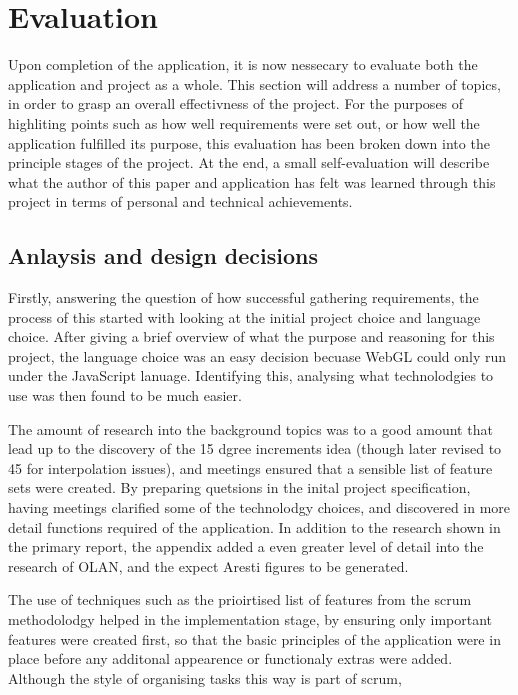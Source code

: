 \chapter{Evaluation}
Upon completion of the application, it is now nessecary to evaluate both the application and project as a whole. This section will address a number of topics, in order to grasp an overall effectivness of the project. For the purposes of highliting points such as how well requirements were set out, or how well the application fulfilled its purpose, this evaluation has been broken down into the principle stages of the project. At the end, a small self-evaluation will describe what the author of this paper and application has felt was learned through this project in terms of personal and technical achievements.

\section{Anlaysis and design decisions}
Firstly, answering the question of how successful gathering requirements, the process of this started with looking at the initial project choice and language choice. After giving a brief overview of what the purpose and reasoning for this project, the language choice was an easy decision becuase WebGL could only run under the JavaScript lanuage. Identifying this, analysing what technolodgies to use was then found to be much easier. 

The amount of research into the background topics was to a good amount that lead up to the discovery of the 15 dgree increments idea (though later revised to 45 for interpolation issues), and meetings ensured that a sensible list of feature sets were created. By preparing quetsions in the inital project specification, having meetings clarified some of the technolodgy choices, and discovered in more detail functions required of the application. In addition to the research shown in the primary report, the appendix added a even greater level of detail into the research of OLAN, and the expect Aresti figures to be generated.

The use of techniques such as the prioirtised list of features from the scrum methodolodgy helped in the implementation stage, by ensuring only important features were created first, so that the basic principles of the application were in place before any additonal appearence or functionaly extras were added. Although the style of organising tasks this way is part of scrum, 

